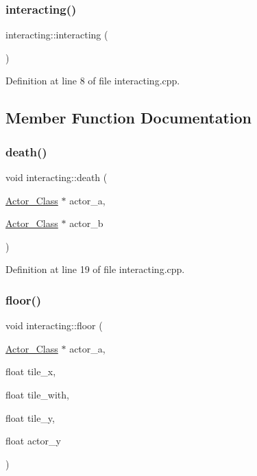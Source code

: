 \subsubsection{\texorpdfstring{interacting()}{interacting()}}
{\footnotesize\ttfamily interacting\+::interacting (\begin{DoxyParamCaption}{ }\end{DoxyParamCaption})}



Definition at line 8 of file interacting.\+cpp.



\subsection{Member Function Documentation}
\hypertarget{classinteracting_a72962dcd137f0451ac1149e3ab2745c3}{}\label{classinteracting_a72962dcd137f0451ac1149e3ab2745c3} 
\subsubsection{\texorpdfstring{death()}{death()}}
{\footnotesize\ttfamily void interacting\+::death (\begin{DoxyParamCaption}\item[{\hyperlink{class_actor___class}{Actor\+\_\+\+Class} $\ast$}]{actor\+\_\+a,  }\item[{\hyperlink{class_actor___class}{Actor\+\_\+\+Class} $\ast$}]{actor\+\_\+b }\end{DoxyParamCaption})}



Definition at line 19 of file interacting.\+cpp.

\hypertarget{classinteracting_a0b4bb6b7b2119c7e17ebc6717e66ff1f}{}\label{classinteracting_a0b4bb6b7b2119c7e17ebc6717e66ff1f} 
\subsubsection{\texorpdfstring{floor()}{floor()}}
{\footnotesize\ttfamily void interacting\+::floor (\begin{DoxyParamCaption}\item[{\hyperlink{class_actor___class}{Actor\+\_\+\+Class} $\ast$}]{actor\+\_\+a,  }\item[{float}]{tile\+\_\+x,  }\item[{float}]{tile\+\_\+with,  }\item[{float}]{tile\+\_\+y,  }\item[{float}]{actor\+\_\+y }\end{DoxyParamCaption})}



